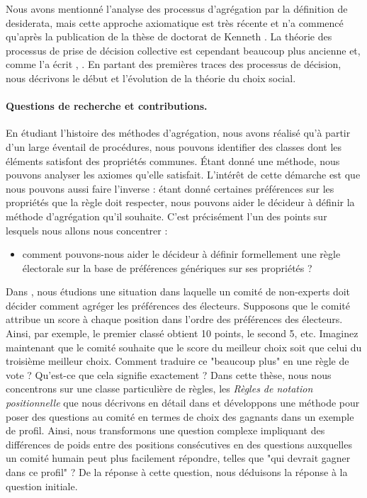 	Nous avons mentionné l'analyse des processus d'agrégation par la définition de desiderata, mais cette approche axiomatique est très récente et n'a commencé qu'après la publication de la thèse de doctorat de Kenneth \citet{Arrow1951}.
	La théorie des processus de prise de décision collective est cependant beaucoup plus ancienne et, comme l'a écrit \citet{McLean1990}, . En partant des premières traces des processus de décision, nous décrivons le début et l'évolution de la théorie du choix social. 
	
	\paragraph{Questions de recherche et contributions.}
	En étudiant l'histoire des méthodes d'agrégation, nous avons réalisé qu'à partir d'un large éventail de procédures, nous pouvons identifier des classes dont les éléments satisfont des propriétés communes. Étant donné une méthode, nous pouvons analyser les axiomes qu'elle satisfait.
	L'intérêt de cette démarche est que nous pouvons aussi faire l'inverse : étant donné certaines préférences sur les propriétés que la règle doit respecter, nous pouvons aider le décideur à définir la méthode d'agrégation qu'il souhaite. 
	C'est précisément l'un des points sur lesquels nous allons nous concentrer : 
	\begin{itemize}
		\item comment pouvons-nous aider le décideur à définir formellement une règle électorale sur la base de préférences génériques sur ses propriétés ?
	\end{itemize}
	Dans , nous étudions une situation dans laquelle un comité de non-experts doit décider comment agréger les préférences des électeurs. 
	Supposons que le comité attribue un score à chaque position dans l'ordre des préférences des électeurs. Ainsi, par exemple, le premier classé obtient 10 points, le second 5, etc.
	Imaginez maintenant que le comité souhaite que le score du meilleur choix soit  que celui du troisième meilleur choix.
	Comment traduire ce "beaucoup plus" en une règle de vote ? Qu'est-ce que cela signifie exactement ?
	Dans cette thèse, nous nous concentrons sur une classe particulière de règles, les \textit{Règles de notation positionnelle} \textemdash que nous décrivons en détail dans  \textemdash et développons une méthode pour poser des questions au comité en termes de choix des gagnants dans un exemple de profil. 
	Ainsi, nous transformons une question complexe impliquant des différences de poids entre des positions consécutives en des questions auxquelles un comité humain peut plus facilement répondre, telles que "qui devrait gagner dans ce profil" ? De la réponse à cette question, nous déduisons la réponse à la question initiale.
	
